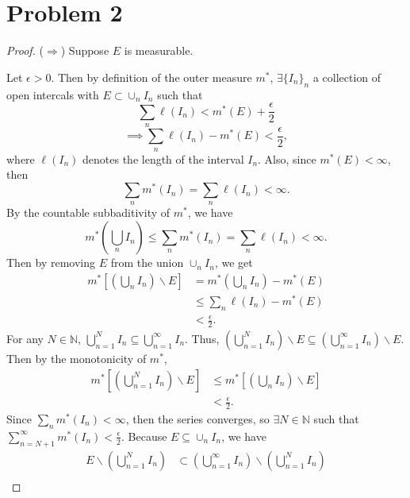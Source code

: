 \documentclass{article}
\begin{document}
\section*{Problem 2}
\begin{proof}
	($\Rightarrow$) Suppose $E$ is measurable. 
	
	Let $\epsilon > 0$. Then by definition of the outer measure $m^*$, $\exists \{I_n\}_n$ a collection of open intercals with $E\subset \cup_n I_n$ such that
	\begin{equation}
		\sum_n \ell(I_n) < m^*(E) + \frac{\epsilon}{2}
	\end{equation}
	\begin{equation}
		\implies \sum_n \ell (I_n) - m^*(E) < \frac{\epsilon}{2},
	\end{equation}
	where $\ell (I_n)$ denotes the length of the interval $I_n$. Also, since $m^*(E) < \infty$, then
	\begin{equation}
		\sum_n m^*(I_n) = \sum_n \ell (I_n) < \infty.
	\end{equation}
	By the countable subbaditivity of $m^*$, we have
	\begin{equation}
		m^*\left(\bigcup_n I_n\right) \leq \sum_n m^*(I_n) = \sum_n \ell (I_n) < \infty.
	\end{equation}
	Then by removing $E$ from the union $\cup_n I_n$, we get
	\begin{align}
		m^*\left[\left(\bigcup_n I_n\right) \backslash E\right] &= m^*\left(\bigcup_n I_n \right) - m^*(E) \\
		&\leq \sum_n \ell (I_n) - m^*(E) \\
		&< \frac{\epsilon}{2}.
	\end{align}
	For any $N \in \mathbb{N}$, $\bigcup_{n=1}^N I_n \subseteq \bigcup_{n=1}^{\infty}I_n$. Thus, $\left(\bigcup_{n=1}^N I_n\right) \backslash E \subseteq \left(\bigcup_{n=1}^{\infty}I_n\right) \backslash E$. Then by the monotonicity of $m^*$,
	\begin{align}\label{star}
		m^*\left[\left(\bigcup_{n=1}^N I_n\right) \backslash E\right] &\leq m^*\left[\left(\bigcup_n I_n\right) \backslash E\right] \\
		& < \frac{\epsilon}{2}.
	\end{align}
	Since $\sum_n m^*(I_n) < \infty$, then the series converges, so $\exists N \in \mathbb{N}$ such that \\$\sum_{n=N+1}^{\infty}m^*(I_n) < \frac{\epsilon}{2}$. Because $E \subseteq \cup_n I_n$, we have
	\begin{align}
		E \backslash \left(\bigcup_{n=1}^N I_n\right) &\subset \left(\bigcup_{n=1}^{\infty}I_n\right) \backslash \left(\bigcup_{n=1}^N I_n\right) \\

\end{align}
\end{proof}
\end{document}
